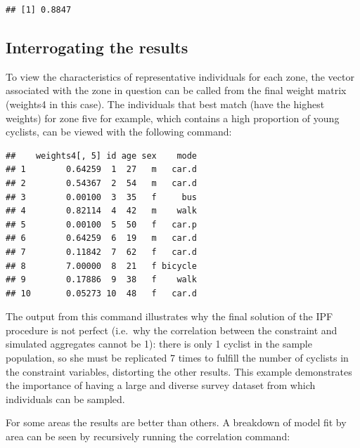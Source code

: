 \begin{Shaded}
\begin{Highlighting}[]
\NormalTok{(}\NormalTok{(}\NormalTok{(}
\end{Highlighting}
\end{Shaded}
\begin{verbatim}
## [1] 0.8847
\end{verbatim}
\subsection{Interrogating the results}

To view the characteristics of representative individuals for each zone,
the vector associated with the zone in question can be called from the
final weight matrix (weights4 in this case). The individuals that best
match (have the highest weights) for zone five for example, which
contains a high proportion of young cyclists, can be viewed with the
following command:

\begin{Shaded}
\begin{Highlighting}[]
\NormalTok{(weights4[, }\NormalTok{], USd)}
\end{Highlighting}
\end{Shaded}
\begin{verbatim}
##    weights4[, 5] id age sex    mode
## 1        0.64259  1  27   m   car.d
## 2        0.54367  2  54   m   car.d
## 3        0.00100  3  35   f     bus
## 4        0.82114  4  42   m    walk
## 5        0.00100  5  50   f   car.p
## 6        0.64259  6  19   m   car.d
## 7        0.11842  7  62   f   car.d
## 8        7.00000  8  21   f bicycle
## 9        0.17886  9  38   f    walk
## 10       0.05273 10  48   f   car.d
\end{verbatim}
The output from this command illustrates why the final solution of the
IPF procedure is not perfect (i.e.~why the correlation between the
constraint and simulated aggregates cannot be 1): there is only 1
cyclist in the sample population, so she must be replicated 7 times to
fulfill the number of cyclists in the constraint variables, distorting
the other results. This example demonstrates the importance of having a
large and diverse survey dataset from which individuals can be sampled.

For some areas the results are better than others. A breakdown of model
fit by area can be seen by recursively running the correlation command:

